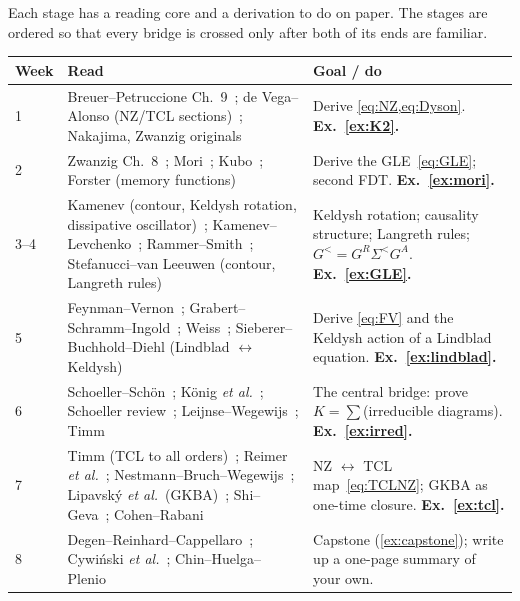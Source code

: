 \documentclass[11pt]{article}
\begin{document}
Each stage has a reading core and a derivation to do on paper. The stages are ordered
so that every bridge is crossed only after both of its ends are familiar.

\begin{center}
\small
\renewcommand{\arraystretch}{1.3}
\begin{tabularx}{\textwidth}{@{}p{1.3cm}>{\raggedright\arraybackslash}p{4.6cm}>{\raggedright\arraybackslash}X@{}}
\toprule
\textbf{Week} & \textbf{Read} & \textbf{Goal / do} \\
\midrule
1 & Breuer--Petruccione Ch.~9~\cite{BreuerPetruccione}; de Vega--Alonso (NZ/TCL
    sections)~\cite{deVega2017}; Nakajima, Zwanzig originals~\cite{Nakajima1958,Zwanzig1960}
  & Derive \cref{eq:NZ,eq:Dyson}. \textbf{Ex.~\ref{ex:K2}.} \\
2 & Zwanzig Ch.~8~\cite{ZwanzigBook}; Mori~\cite{Mori1965}; Kubo~\cite{Kubo1966};
    Forster (memory functions)~\cite{Forster1975}
  & Derive the GLE~\eqref{eq:GLE}; second FDT. \textbf{Ex.~\ref{ex:mori}.} \\
3--4 & Kamenev (contour, Keldysh rotation, dissipative oscillator)~\cite{Kamenev2011};
    Kamenev--Levchenko~\cite{KamenevLevchenko2009}; Rammer--Smith~\cite{RammerSmith1986};
    Stefanucci--van Leeuwen (contour, Langreth rules)~\cite{StefanucciVanLeeuwen}
  & Keldysh rotation; causality structure; Langreth rules; $G^<=G^R\Sigma^<G^A$. \textbf{Ex.~\ref{ex:GLE}.} \\
5 & Feynman--Vernon~\cite{FeynmanVernon1963}; Grabert--Schramm--Ingold~\cite{Grabert1988};
    Weiss~\cite{Weiss2012}; Sieberer--Buchhold--Diehl (Lindblad $\leftrightarrow$ Keldysh)~\cite{Sieberer2016}
  & Derive \cref{eq:FV} and the Keldysh action of a Lindblad equation. \textbf{Ex.~\ref{ex:lindblad}.} \\
6 & Schoeller--Sch\"on~\cite{SchoellerSchon1994}; K\"onig \emph{et al.}~\cite{Konig1996};
    Schoeller review~\cite{Schoeller2009}; Leijnse--Wegewijs~\cite{LeijnseWegewijs2008}; Timm~\cite{Timm2008}
  & The central bridge: prove $K=\sum$(irreducible diagrams). \textbf{Ex.~\ref{ex:irred}.} \\
7 & Timm (TCL to all orders)~\cite{Timm2011}; Reimer \emph{et al.}~\cite{Reimer2019};
    Nestmann--Bruch--Wegewijs~\cite{Nestmann2021}; Lipavsk\'y \emph{et al.}\ (GKBA)~\cite{Lipavsky1986};
    Shi--Geva~\cite{ShiGeva2003}; Cohen--Rabani~\cite{CohenRabani2011}
  & NZ $\leftrightarrow$ TCL map~\eqref{eq:TCLNZ}; GKBA as one-time closure. \textbf{Ex.~\ref{ex:tcl}.} \\
8 & Degen--Reinhard--Cappellaro~\cite{Degen2017}; Cywi\'nski \emph{et al.}~\cite{Cywinski2008};
    Chin--Huelga--Plenio~\cite{Chin2012}
  & Capstone (\cref{ex:capstone}); write up a one-page summary of your own. \\
\bottomrule
\end{tabularx}
\end{center}
\end{document}
